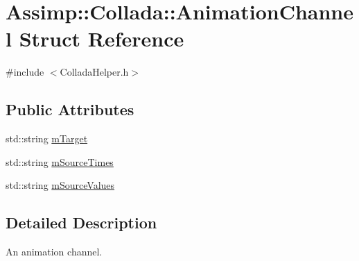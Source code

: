 \hypertarget{struct_assimp_1_1_collada_1_1_animation_channel}{\section{Assimp\+:\+:Collada\+:\+:Animation\+Channel Struct Reference}
\label{struct_assimp_1_1_collada_1_1_animation_channel}
}


{\ttfamily \#include $<$Collada\+Helper.\+h$>$}

\subsection*{Public Attributes}
\begin{DoxyCompactItemize}
\item 
std\+::string \hyperlink{struct_assimp_1_1_collada_1_1_animation_channel_a97468bb33e251b8856e52c244b3329e2}{m\+Target}
\item 
std\+::string \hyperlink{struct_assimp_1_1_collada_1_1_animation_channel_aed94e0b4e662d7faf092c6d102f0c512}{m\+Source\+Times}
\item 
std\+::string \hyperlink{struct_assimp_1_1_collada_1_1_animation_channel_a97913fbc6b259a9b79123de6067a838b}{m\+Source\+Values}
\end{DoxyCompactItemize}


\subsection{Detailed Description}
An animation channel. 

